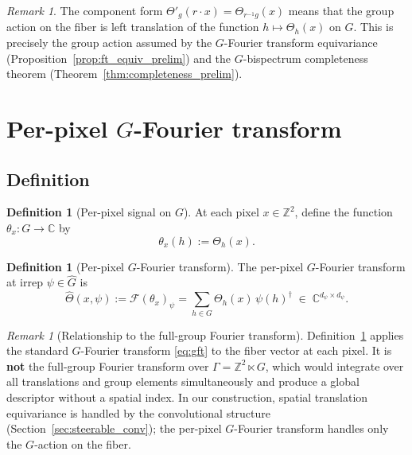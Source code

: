 \documentclass{article}
\theoremstyle{definition}
\newtheorem{definition}[theorem]{Definition}
\theoremstyle{remark}
\newtheorem{remark}[theorem]{Remark}
\newcommand{\FF}{\mathcal{F}}
\newcommand{\C}{\mathbb{C}}
\newcommand{\Z}{\mathbb{Z}}
\newcommand{\Ghat}{\widehat{G}}
\begin{document}
\begin{remark}\label{rem:left_translation}
The component form $\Theta'_g(r \cdot x) = \Theta_{r^{-1}g}(x)$ means that the group action on the fiber is left translation of the function $h \mapsto \Theta_h(x)$ on $G$. This is precisely the group action assumed by the $G$-Fourier transform equivariance (Proposition~\ref{prop:ft_equiv_prelim}) and the $G$-bispectrum completeness theorem (Theorem~\ref{thm:completeness_prelim}).
\end{remark}

\section{Per-pixel $G$-Fourier transform}

\subsection{Definition}

\begin{definition}[Per-pixel signal on $G$]\label{def:perpixel_signal}
At each pixel $x \in \Z^2$, define the function $\theta_x : G \to \C$ by
\begin{equation}\label{eq:theta_x}
\theta_x(h) := \Theta_h(x).
\end{equation}
\end{definition}

\begin{definition}[Per-pixel $G$-Fourier transform]\label{def:perpixel_ft}
The per-pixel $G$-Fourier transform at irrep $\psi \in \Ghat$ is
\begin{equation}\label{eq:perpixel_ft}
\widehat{\Theta}(x, \psi) := \FF(\theta_x)_\psi = \sum_{h \in G} \Theta_h(x)\, \psi(h)^\dagger \;\in\; \C^{d_\psi \times d_\psi}.
\end{equation}
\end{definition}

\begin{remark}[Relationship to the full-group Fourier transform]
Definition~\ref{def:perpixel_ft} applies the standard $G$-Fourier transform \eqref{eq:gft} to the fiber vector at each pixel. It is \textbf{not} the full-group Fourier transform over $\Gamma = \Z^2 \ltimes G$, which would integrate over all translations and group elements simultaneously and produce a global descriptor without a spatial index. In our construction, spatial translation equivariance is handled by the convolutional structure (Section~\ref{sec:steerable_conv}); the per-pixel $G$-Fourier transform handles only the $G$-action on the fiber.
\end{remark}
\end{document}
